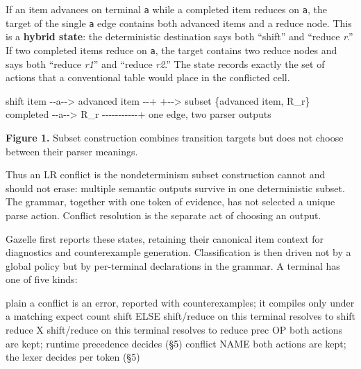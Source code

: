 \documentclass[
  10pt,
]{article}
\newenvironment{Shaded}{}{}
\newcommand{\NormalTok}[1]{#1}
\begin{document}
If an item advances on terminal \texttt{a} while a completed item
reduces on \texttt{a}, the target of the single \texttt{a} edge contains
both advanced items and a reduce node. This is a \textbf{hybrid state}:
the deterministic destination says both ``shift'' and ``reduce
\emph{r}.'' If two completed items reduce on \texttt{a}, the target
contains two reduce nodes and says both ``reduce \emph{r1}'' and
``reduce \emph{r2}.'' The state records exactly the set of actions that
a conventional table would place in the conflicted cell.

\begin{Shaded}
\begin{Highlighting}[]
\NormalTok{shift item   {-}{-}a{-}{-}\textgreater{}  advanced item {-}{-}+}
\NormalTok{                                      +{-}{-}\textgreater{} subset \{advanced item, R\_r\}}
\NormalTok{completed    {-}{-}a{-}{-}\textgreater{}  R\_r {-}{-}{-}{-}{-}{-}{-}{-}{-}{-}{-}+}
\NormalTok{                           one edge, two parser outputs}
\end{Highlighting}
\end{Shaded}

\textbf{Figure 1.} Subset construction combines transition targets but
does not choose between their parser meanings.

Thus an LR conflict is the nondeterminism subset construction cannot and
should not erase: multiple semantic outputs survive in one deterministic
subset. The grammar, together with one token of evidence, has not
selected a unique parse action. Conflict resolution is the separate act
of choosing an output.

Gazelle first reports these states, retaining their canonical item
context for diagnostics and counterexample generation. Classification is
then driven not by a global policy but by per-terminal declarations in
the grammar. A terminal has one of five kinds:

\begin{Shaded}
\begin{Highlighting}[]
\NormalTok{plain           a conflict is an error, reported with counterexamples;}
\NormalTok{                it compiles only under a matching \textasciigrave{}expect\textasciigrave{} count}
\NormalTok{shift ELSE      shift/reduce on this terminal resolves to shift}
\NormalTok{reduce X        shift/reduce on this terminal resolves to reduce}
\NormalTok{prec OP         both actions are kept; runtime precedence decides (§5)}
\NormalTok{conflict NAME   both actions are kept; the lexer decides per token (§5)}
\end{Highlighting}
\end{Shaded}
\end{document}
